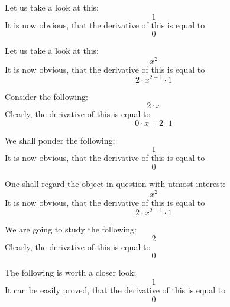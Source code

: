 \documentclass{article}
\begin{document}
Let us take a look at this:
\begin{equation}
1 
\end{equation}
It is now obvious, that the derivative of this is equal to
\begin{equation}
0 
\end{equation}

Let us take a look at this:
\begin{equation}
x ^{2 } 
\end{equation}
It is now obvious, that the derivative of this is equal to
\begin{equation}
2 \cdot x ^{2 - 1 } \cdot 1 
\end{equation}

Consider the following:
\begin{equation}
2 \cdot x 
\end{equation}
Clearly, the derivative of this is equal to
\begin{equation}
0 \cdot x + 2 \cdot 1 
\end{equation}

We shall ponder the following:
\begin{equation}
1 
\end{equation}
It is now obvious, that the derivative of this is equal to
\begin{equation}
0 
\end{equation}

One shall regard the object in question with utmost interest:
\begin{equation}
x ^{2 } 
\end{equation}
It is now obvious, that the derivative of this is equal to
\begin{equation}
2 \cdot x ^{2 - 1 } \cdot 1 
\end{equation}

We are going to study the following:
\begin{equation}
2 
\end{equation}
Clearly, the derivative of this is equal to
\begin{equation}
0 
\end{equation}

The following is worth a closer look:
\begin{equation}
1 
\end{equation}
It can be easily proved, that the derivative of this is equal to
\begin{equation}
0 
\end{equation}
\end{document}
